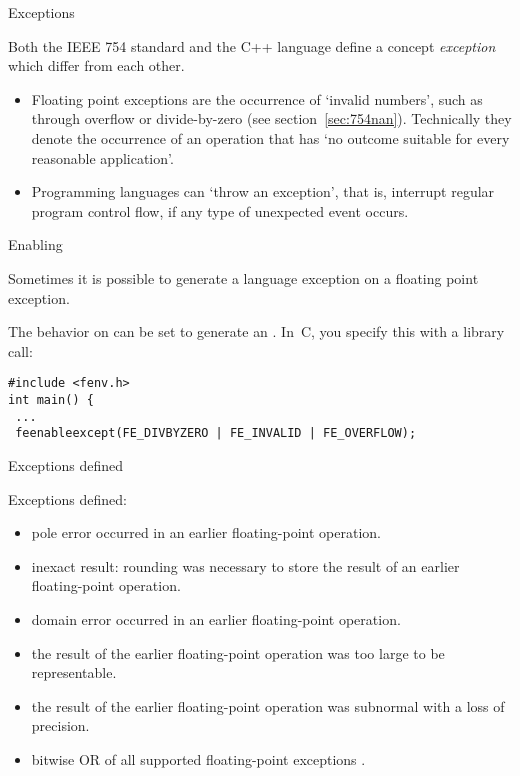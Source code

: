 \lstset{language=C}

 {Exceptions}
\label{sec:catch-exp}

Both the IEEE 754 standard and the C++ language define a concept
\emph{exception} which differ from each
other.
\begin{itemize}
\item Floating point exceptions are the occurrence of `invalid numbers',
  such as through overflow or divide-by-zero (see section~\ref{sec:754nan}).
  Technically they denote the occurrence of an operation that has `no outcome
suitable for every reasonable application'. 
\item Programming languages can `throw an exception', that is, interrupt regular
  program control flow, if any type of unexpected event occurs.
\end{itemize}

 {Enabling}

Sometimes it is possible to generate a language exception
on a floating point exception.


The behavior on  can be set to generate an
.
In~C, you specify this with a library call:
\begin{lstlisting}
#include <fenv.h>
int main() { 
 ...
 feenableexcept(FE_DIVBYZERO | FE_INVALID | FE_OVERFLOW);
\end{lstlisting}


 {Exceptions defined}

Exceptions defined:
\begin{itemize}
\item {} pole error occurred in an earlier
  floating-point operation.
\item {} inexact result: rounding was
  necessary to store the result of an earlier floating-point
  operation.
\item {} domain error occurred in an earlier
  floating-point operation.
\item {} the result of the earlier
  floating-point operation was too large to be representable.
\item {} the result of the earlier
  floating-point operation was subnormal with a loss of precision.
\item {} bitwise OR of all supported
  floating-point exceptions .
\end{itemize}

